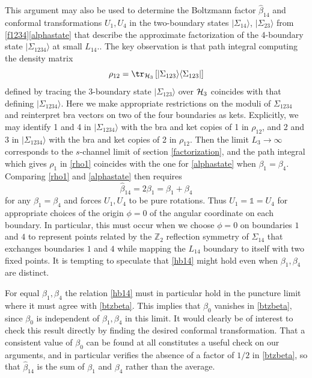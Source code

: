 \documentclass[12pt]{article}
\newcommand{\be}{\begin{equation}}
\newcommand{\ee}{\end{equation}}
\numberwithin{equation}{section}
\begin{document}
This argument may also be used to determine the Boltzmann factor $\hat \beta_{14}$ and conformal transformations $U_1,U_4$ in the two-boundary states $|\Sigma_{14} \rangle$, $|\Sigma_{23} \rangle$ from \eqref{f1234}\eqref{alphastate} that describe the approximate factorization of the 4-boundary state $|\Sigma_{1234} \rangle$ at small $L_{14}$..  The key observation is that path integral computing the density matrix
\begin{equation}
\rho_{12} = \tr_{{\cal H}_3} \left[ |\Sigma_{123} \rangle \langle \Sigma_{123} | \right]
\end{equation}
defined by tracing the 3-boundary state $|\Sigma_{123} \rangle$ over  ${\cal H}_3$ coincides with that defining $|\Sigma_{1234} \rangle$.  Here we make appropriate restrictions on the moduli of $\Sigma_{1234}$ and reinterpret bra vectors on two of the four boundaries as kets. Explicitly, we may identify 1 and 4 in $|\Sigma_{1234} \rangle$ with the bra and ket copies of 1 in $\rho_{12}$, and 2 and 3 in $|\Sigma_{1234} \rangle$ with the bra and ket copies of 2 in $\rho_{12}$. Then the limit $L_3 \to \infty$ corresponds to the $s$-channel limit of section  \ref{factorization}, and the path integral which gives $\rho_1$ in \eqref{rho1} coincides with the one for \eqref{alphastate} when $\beta_1 = \beta_4$.  Comparing \eqref{rho1} and \eqref{alphastate} then requires
\be
\label{hb14}
\hat \beta_{14} = 2 \beta_1 = \beta_ 1 + \beta_4
\ee
for any $\beta_1 = \beta_4$ and forces $U_1,U_4$ to be pure rotations. Thus $U_1 = \mathds{1} = U_4$ for appropriate choices  of the origin $\phi=0$ of the angular coordinate on each boundary.  In particular, this must occur when we choose $\phi=0$ on boundaries $1$ and $4$ to represent points related by the $\mathbb{Z}_2$ reflection symmetry of $\Sigma_{14}$ that exchanges boundaries $1$ and $4$ while mapping the $L_{14}$ boundary to itself with two fixed points. It is tempting to speculate that \eqref{hb14} might hold even when $\beta_1, \beta_4$ are distinct.

For equal $\beta_1, \beta_4$ the relation \eqref{hb14} must in particular hold in the puncture limit where it must agree with \eqref{btzbeta}.  This implies that $\beta_0$ vanishes in \eqref{btzbeta}, since $\beta_0$ is independent of $\beta_1, \beta_4$ in this limit.  It would clearly be of interest to check this result directly by finding the desired conformal transformation.  That a consistent value of $\beta_0$ can be found at all constitutes a useful check on our arguments, and in particular verifies the absence of a factor of $1/2$ in \eqref{btzbeta}, so that $\hat \beta_{14}$ is the sum of $\beta_1$ and $\beta_4$ rather than the average.
\end{document}
